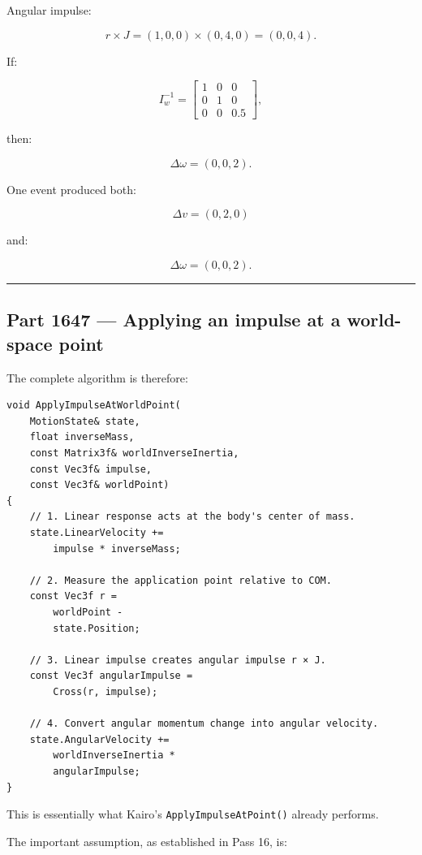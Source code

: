 Angular impulse:

\[
r\times J
=
(1,0,0)\times(0,4,0)
=
(0,0,4).
\]

If:

\[
I_w^{-1}
=
\begin{bmatrix}
1&0&0\\
0&1&0\\
0&0&0.5
\end{bmatrix},
\]

then:

\[
\Delta\omega
=
(0,0,2).
\]

One event produced both:

\[
\Delta v=(0,2,0)
\]

and:

\[
\Delta\omega=(0,0,2).
\]

\begin{center}\rule{0.5\linewidth}{0.5pt}\end{center}

\subsection{Part 1647 --- Applying an impulse at a world-space point}\label{06-engine-ii-ch036-part-1647-applying-an-impulse-at-a-world-space-point}

The complete algorithm is therefore:

\begin{verbatim}
void ApplyImpulseAtWorldPoint(
    MotionState& state,
    float inverseMass,
    const Matrix3f& worldInverseInertia,
    const Vec3f& impulse,
    const Vec3f& worldPoint)
{
    // 1. Linear response acts at the body's center of mass.
    state.LinearVelocity +=
        impulse * inverseMass;

    // 2. Measure the application point relative to COM.
    const Vec3f r =
        worldPoint -
        state.Position;

    // 3. Linear impulse creates angular impulse r × J.
    const Vec3f angularImpulse =
        Cross(r, impulse);

    // 4. Convert angular momentum change into angular velocity.
    state.AngularVelocity +=
        worldInverseInertia *
        angularImpulse;
}
\end{verbatim}

This is essentially what Kairo's \texttt{ApplyImpulseAtPoint()} already performs.

The important assumption, as established in Pass 16, is:

